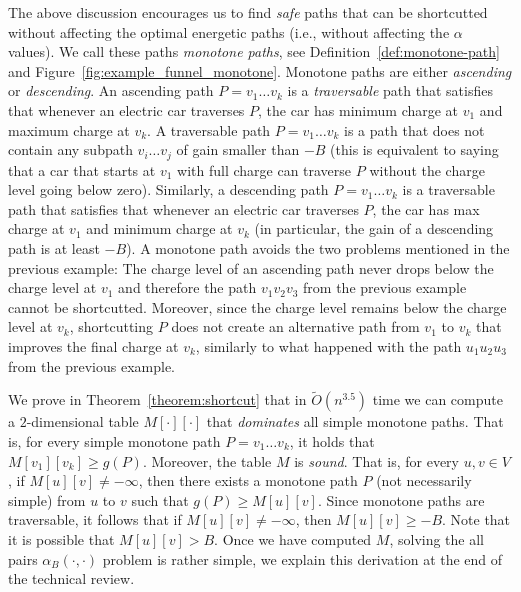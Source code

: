 \documentclass[11pt]{article}
\begin{document}
The above discussion encourages us to find \emph{safe} paths that can be shortcutted without affecting the optimal energetic paths (i.e., without affecting the $\alpha$ values). We call these paths \emph{monotone paths}, see Definition~\ref{def:monotone-path} and Figure~\ref{fig:example_funnel_monotone}.  
Monotone paths are either \emph{ascending} or \emph{descending}. An ascending path $P = v_1\ldots v_k$ is a \emph{traversable} path that satisfies that whenever an electric car traverses $P$,  the car has minimum charge at $v_1$ and maximum charge at $v_k$. A traversable path $P = v_1 \ldots v_k$ is a path that does not contain any subpath $v_i \ldots v_j$ of gain smaller than $-B$ (this is equivalent to saying that a car that starts at $v_1$ with full charge can traverse $P$ without the charge level going below zero).
Similarly, a descending path $P = v_1\ldots v_k$ is a traversable path that satisfies that whenever an electric car traverses $P$,  the car has max charge at $v_1$ and minimum charge at $v_k$ (in particular, the gain of a descending path is at least $-B$).
A monotone path avoids the two problems mentioned in the previous example: The charge level of an ascending path never drops below the charge level at $v_1$ and therefore the path $v_1 v_2 v_3$ from the previous example cannot be shortcutted. Moreover, since the charge level remains below the charge level at $v_k$, shortcutting $P$ does not create an alternative path from $v_1$ to $v_k$ that improves the final charge at $v_k$, similarly to what happened with the path $u_1 u_2 u_3$ from the previous example. 

We prove in Theorem~\ref{theorem:shortcut} that in $\tilde{O}(n^{3.5})$ time we can compute a $2$-dimensional table $M[\cdot][\cdot]$ that \emph{dominates} all simple monotone paths. That is, for every simple monotone path $P = v_1\ldots v_k$, it holds that $M[v_1][v_k] \ge g(P)$. Moreover, the table $M$ is \emph{sound}. That is, for every $u,v\in V$, if $M[u][v] \neq -\infty$, then there exists a monotone path $P$ (not necessarily simple) from $u$ to $v$ such that $g(P) \ge M[u][v]$.
Since monotone paths are traversable, it follows that if $M[u][v] \neq -\infty$, then $M[u][v] \ge -B$. Note that it is possible that $M[u][v] > B$.
Once we have computed $M$, solving the all pairs $\alpha_B(\cdot,\cdot)$ problem is rather simple, we explain this derivation at the end of the technical review. 
\end{document}
